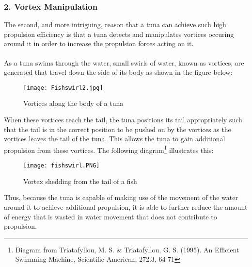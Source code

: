 \subsubsection{2. Vortex Manipulation}
%
The second, and more intriguing, reason that a tuna can achieve such high propulsion efficiency is that a tuna detects and manipulates vortices occuring around it in order to increase the propulsion forces acting on it.\\ \\
%
As a tuna swims through the water, small swirls of water, known as vortices, are generated that travel down the side of its body as shown in the figure below:

\begin{figure}[h!]
\centering
\texttt{[image: Fishswirl2.jpg]}
\caption{Vortices along the body of a tuna}
\label{fig:simplemag}
\end{figure}

\noindent When these vortices reach the tail, the tuna positions its tail appropriately such that the tail is in the correct position to be pushed on by the vortices as the vortices leaves the tail of the tuna. This allows the tuna to gain additional propulsion from these vortices. The following diagram\footnote{Diagram from Triatafyllou, M. S. \& Triatafyllou, G. S. (1995). An Efficient Swimming Machine, Scientific American, 272.3, 64-71} illustrates this:

\newpage
\begin{figure}[h!]
\centering
\texttt{[image: fishswirl.PNG]}
\caption{Vortex shedding from the tail of a fish}
\label{fig:simplemag}
\end{figure}


\noindent Thus, because the tuna is capable of making use of the movement of the water around it to achieve additional propulsion, it is able to further reduce the amount of energy that is wasted in water movement that does not contribute to propulsion.